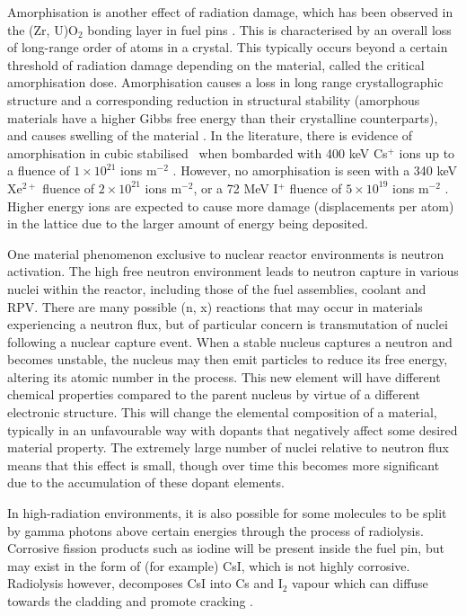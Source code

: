 Amorphisation is another effect of radiation damage, which has been observed in the (Zr, U)O$_{2}$ bonding layer in fuel pins \cite{Nogita1997}. This is characterised by an overall loss of long-range order of atoms in a crystal. This typically occurs beyond a certain threshold of radiation damage depending on the material, called the critical amorphisation dose. Amorphisation causes a loss in long range crystallographic structure and a corresponding reduction in structural stability (amorphous materials have a higher Gibbs free energy than their crystalline counterparts), and causes swelling of the material \cite{Einfal2013}. In the literature, there is evidence of amorphisation in cubic stabilised \zirconia\ when bombarded with 400 keV Cs$^{+}$ ions up to a fluence of $1 \times 10^{21}$ ions m$^{-2}$ \cite{amorphization2000wang}. However, no amorphisation is seen with a 340 keV Xe$^{2+}$ fluence of $2 \times 10^{21}$ ions m$^{-2}$, or a 72 MeV I$^{+}$ fluence of $5 \times 10^{19}$ ions m$^{-2}$ \cite{sickafus1999radiation}. Higher energy ions are expected to cause more damage (displacements per atom) in the lattice due to the larger amount of energy being deposited.

One material phenomenon exclusive to nuclear reactor environments is neutron activation. The high free neutron environment leads to neutron capture in various nuclei within the reactor, including those of the fuel assemblies, coolant and RPV. There are many possible (n, x) reactions that may occur in materials experiencing a neutron flux, but of particular concern is transmutation of nuclei following a nuclear capture event. When a stable nucleus captures a neutron and becomes unstable, the nucleus may then emit particles to reduce its free energy, altering its atomic number in the process. This new element will have different chemical properties compared to the parent nucleus by virtue of a different electronic structure. This will change the elemental composition of a material, typically in an unfavourable way with dopants that negatively affect some desired material property. The extremely large number of nuclei relative to neutron flux means that this effect is small, though over time this becomes more significant due to the accumulation of these dopant elements.

In high-radiation environments, it is also possible for some molecules to be split by gamma photons above certain energies through the process of radiolysis. Corrosive fission products such as iodine will be present inside the fuel pin, but may exist in the form of (for example) CsI, which is not highly corrosive. Radiolysis however, decomposes CsI into Cs and I$_{2}$ vapour which can diffuse towards the cladding and promote cracking \cite{Konashi1983}.

